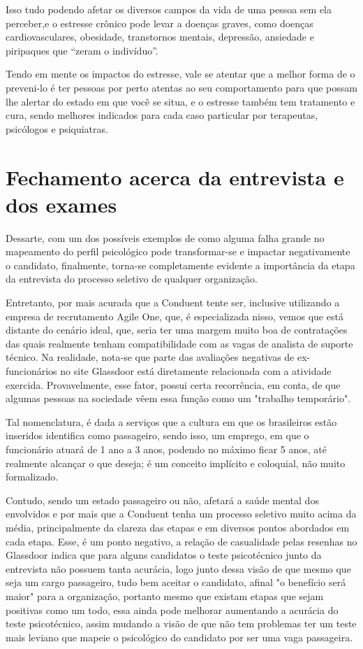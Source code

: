 \documentclass[12pt]{article}
\begin{document}
Isso tudo podendo afetar os diversos campos da vida de uma pessoa sem ela perceber,e o estresse crônico pode levar a doenças graves, como doenças cardiovasculares, obesidade, transtornos mentais, depressão, ansiedade e piripaques que “zeram o indivíduo”.

Tendo em mente os impactos do estresse, vale se atentar que a melhor forma de o preveni-lo é ter pessoas por perto atentas ao seu comportamento para que possam lhe alertar do estado em que você se situa, e o estresse também tem tratamento e cura, sendo melhores indicados para cada caso particular por terapeutas, psicólogos e psiquiatras.

\section{Fechamento acerca da entrevista e dos exames}


Dessarte, com um dos possíveis exemplos de como alguma falha grande no mapeamento do perfil psicológico pode transformar-se e impactar negativamente o candidato, finalmente, torna-se completamente evidente a importância da etapa da entrevista do processo seletivo de qualquer organização.

Entretanto, por mais acurada que a Conduent tente ser, inclusive utilizando a empresa de recrutamento Agile One, que, é especializada nisso, vemos que está distante do cenário ideal, que, seria ter uma margem muito boa de contratações das quais realmente tenham compatibilidade com as vagas de analista de suporte técnico. Na realidade, nota-se que parte das avaliações negativas de ex-funcionários no site Glassdoor está diretamente relacionada com a atividade exercida. Provavelmente, esse fator, possui certa recorrência, em conta, de que algumas pessoas na sociedade vêem essa função como um "trabalho temporário".

Tal nomenclatura, é dada a serviços que a cultura em que os brasileiros estão inseridos identifica como passageiro, sendo isso, um emprego, em que o funcionário atuará de 1 ano a 3 anos, podendo no máximo ficar 5 anos, até realmente alcançar o que deseja; é um conceito implícito e coloquial, não muito formalizado. 

Contudo, sendo um estado passageiro ou não, afetará a saúde mental dos envolvidos e por mais que a Conduent tenha um processo seletivo muito acima da média, principalmente da clareza das etapas e em diversos pontos abordados em cada etapa. Esse, é um ponto negativo, a relação de casualidade pelas resenhas no Glassdoor indica que para alguns candidatos o teste psicotécnico junto da entrevista não possuem tanta acurácia, logo junto dessa visão de que mesmo que seja um cargo passageiro, tudo bem aceitar o candidato, afinal "o benefício será maior" para a organização, portanto mesmo que existam etapas que sejam positivas como um todo, essa ainda pode melhorar aumentando a acurácia do teste psicotécnico, assim mudando a visão de que não tem problemas ter um teste mais leviano que mapeie o psicológico do candidato por ser uma vaga passageira.
\end{document}
